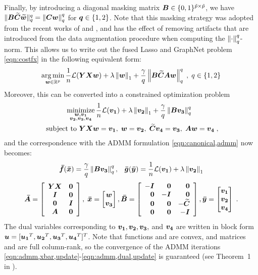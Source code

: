 Finally, by introducing a diagonal masking matrix ${\bm{B}}\in\{0,1\}^{{\tilde{p}}\times{\ensuremath{\tilde{p}}}}$, we have $\|{\bm{B}}{\bm{\widetilde{C}}}{\bm{\widetilde{w}}}\|^q_q = \left\| {\bm{C}}{\bm{w}} \right\|_q^q$ for ${\bm{q}}\in\{1,2\}$.  
Note that this masking strategy was adopted from the recent works of \cite{Allison:2013} and \cite{Matakos:2013}, and has the effect of removing artifacts that are introduced from the data augmentation procedure when computing the $\left\| \cdot \right\|_q^q$-norm.
This allows us to write out the fused Lasso and GraphNet problem \eqref{eqn:costfx} in the following equivalent form:
\begin{equation}
	\operatorname*{arg\,min}_{{\bm{w}}\in\mathbb{R}^p} \frac{1}{n}\mathcal{L}({\bm{YXw}}) + \lambda\left\| {\bm{w}} \right\|_1 + 
		\frac{\gamma}{q}\left\| {\bm{B}}{\bm{\widetilde{C}}}{\bm{A}}{\bm{w}} \right\|^q_q  \; ,\; q\in\{1,2\}
	\nonumber
\end{equation}
Moreover, this can be converted into a constrained optimization problem
\begin{equation}
	\begin{array}{c}
		\dstyle\minimize{\substack{\w,\va \\ \vb,\vc,\vd}} 
			\frac{1}{n}\Loss(\va)+\lambda\norm{\vb}_1+\frac{\gamma}{q}\norm{\B\vc}^q_q \; \; 
			\vspace{0.01\linewidth}\\
		\text{ subject to }  \YXw =\va, \; \w=\vb, \; \Ctil\vd=\vc, \;  \A\w=\vd \;, 
	\end{array}
	\label{eqn:admm,splitting2}
\end{equation}
and the correspondence with the ADMM formulation \eqref{eqn:canonical,admm} now becomes:
\begin{equation}
	\begin{array}{c}
		\fbar(\xbar)=\dstyle\frac{\gamma}{q}\norm{\B\vc}^q_q , \;\;\;
		\gbar(\ybar)=\dstyle\frac{1}{n}\Loss(\va) + \lambda\norm{\vb}_1  
		\vspace{0.02\linewidth} \\
		\Abar = 	\ba{cc} 	\Y\X	& \bzero \\ \I	& \bzero \\ \bzero 	& \I \\ \A & \bzero \ea 	, \;
		\xbar = \bmat \w \\ \vc \emat 			, 
		\Bbar = 	\ba{rrr} 	-\I 	& \bzero	& \bzero \\ \bzero & -\I & \bzero  \\ 
						 \bzero & \bzero & -\Ctil \\ \bzero & \bzero & -\I \ea 		, 
		\ybar = \bmat \va \\ \vb \\ \vd \emat \;.
	\end{array}
	\label{eqn:admm,objective2}
\end{equation}
The dual variables corresponding to ${\bm{v_1}},{\bm{v_2}},{\bm{v_3}},$ and ${\bm{v_4}}$ are written in block form ${\bm{u}}=[{\bm{u_1}}^T,{\bm{u_2}}^T,{\bm{u_3}}^T,{\bm{u_4}}^T]^T$.
Note that functions \fbar and \gbar are convex, and matrices \Abar and \Bbar are full column-rank, so the convergence of the ADMM iterations \eqref{eqn:admm,xbar,update}-\eqref{eqn:admm,dual,update} is guaranteed (see Theorem~1 in \cite{Mota:2011}).

